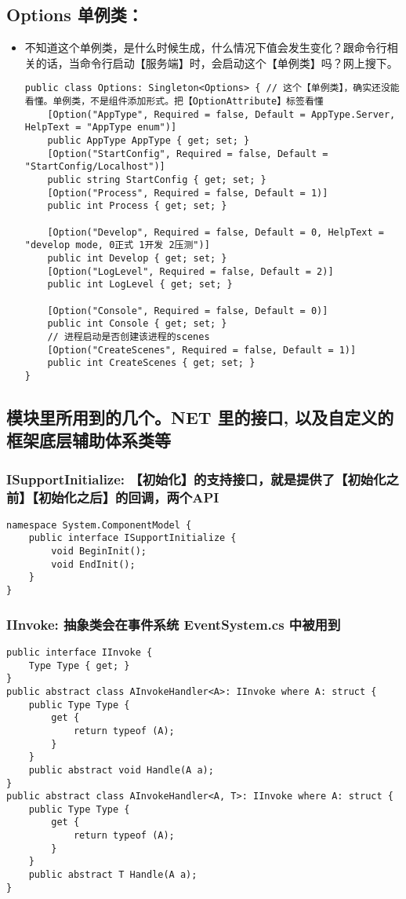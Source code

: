 \documentclass[9pt, b5paper]{article}
\begin{document}
\subsection{Options 单例类：}
\label{sec-1-2}
\begin{itemize}
\item 不知道这个单例类，是什么时候生成，什么情况下值会发生变化？跟命令行相关的话，当命令行启动【服务端】时，会启动这个【单例类】吗？网上搜下。
\begin{verbatim}
public class Options: Singleton<Options> { // 这个【单例类】，确实还没能看懂。单例类，不是组件添加形式。把【OptionAttribute】标签看懂
    [Option("AppType", Required = false, Default = AppType.Server, HelpText = "AppType enum")]
    public AppType AppType { get; set; }
    [Option("StartConfig", Required = false, Default = "StartConfig/Localhost")]
    public string StartConfig { get; set; }
    [Option("Process", Required = false, Default = 1)]
    public int Process { get; set; }

    [Option("Develop", Required = false, Default = 0, HelpText = "develop mode, 0正式 1开发 2压测")]
    public int Develop { get; set; }
    [Option("LogLevel", Required = false, Default = 2)]
    public int LogLevel { get; set; }

    [Option("Console", Required = false, Default = 0)]
    public int Console { get; set; }
    // 进程启动是否创建该进程的scenes
    [Option("CreateScenes", Required = false, Default = 1)]
    public int CreateScenes { get; set; }
}
\end{verbatim}
\end{itemize}

\subsection{模块里所用到的几个。NET 里的接口, 以及自定义的框架底层辅助体系类等}
\label{sec-1-3}
\subsubsection{ISupportInitialize: 【初始化】的支持接口，就是提供了【初始化之前】【初始化之后】的回调，两个API}
\label{sec-1-3-1}
\begin{verbatim}
namespace System.ComponentModel {
    public interface ISupportInitialize {
        void BeginInit();
        void EndInit();
    }
}
\end{verbatim}
\subsubsection{IInvoke: 抽象类会在事件系统 EventSystem.cs 中被用到}
\label{sec-1-3-2}
\begin{verbatim}
public interface IInvoke {
    Type Type { get; }
}
public abstract class AInvokeHandler<A>: IInvoke where A: struct {
    public Type Type {
        get {
            return typeof (A);
        }
    }
    public abstract void Handle(A a);
}
public abstract class AInvokeHandler<A, T>: IInvoke where A: struct {
    public Type Type {
        get {
            return typeof (A);
        }
    }
    public abstract T Handle(A a);
}
\end{verbatim}
\end{document}
